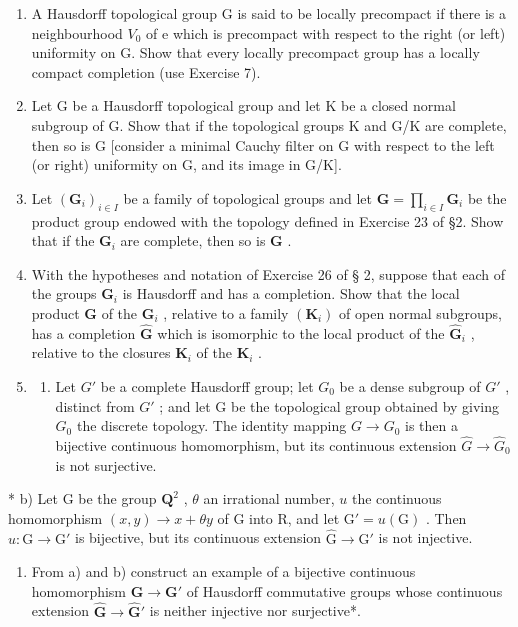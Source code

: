 \begin{enumerate}
\def\labelenumi{\arabic{enumi})}
\setcounter{enumi}{7}
\item
  A Hausdorff topological group G is said to be locally precompact if there is a neighbourhood \(V_{0}\) of e which is precompact with respect to the right (or left) uniformity on G. Show that every locally precompact group has a locally compact completion (use Exercise 7).
\item
  Let G be a Hausdorff topological group and let K be a closed normal subgroup of G. Show that if the topological groups K and G/K are complete, then so is G {[}consider a minimal Cauchy filter on G with respect to the left (or right) uniformity on G, and its image in G/K{]}.
\item
  Let \((\mathbf{G}_i)_{i\in I}\) be a family of topological groups and let \(\mathbf{G} = \prod_{i\in I}\mathbf{G}_i\) be the product group endowed with the topology defined in Exercise 23 of §2. Show that if the \(\mathbf{G}_i\) are complete, then so is \(\mathbf{G}\) .
\item
  With the hypotheses and notation of Exercise 26 of § 2, suppose that each of the groups \(\mathbf{G}_{i}\) is Hausdorff and has a completion. Show that the local product \(\mathbf{G}\) of the \(\mathbf{G}_{i}\) , relative to a family \((\mathbf{K}_{i})\) of open normal subgroups, has a completion \(\hat{\mathbf{G}}\) which is isomorphic to the local product of the \(\hat{\mathbf{G}}_{i}\) , relative to the closures \(\mathbf{K}_{i}\) of the \(\mathbf{K}_{i}\) .
\item
  \begin{enumerate}
  \def\labelenumii{\alph{enumii})}
  \tightlist
  \item
    Let \(G'\) be a complete Hausdorff group; let \(G_{0}\) be a dense subgroup of \(G'\) , distinct from \(G'\) ; and let G be the topological group obtained by giving \(G_{0}\) the discrete topology. The identity mapping \(G \rightarrow G_{0}\) is then a bijective continuous homomorphism, but its continuous extension \(\hat{G} \rightarrow \hat{G}_{0}\) is not surjective.
  \end{enumerate}
\end{enumerate}

* b) Let G be the group \(\mathbf{Q}^2\) , \(\theta\) an irrational number, \(u\) the continuous homomorphism \((x,y)\to x + \theta y\) of G into R, and let \(\mathrm{G}' = u(\mathrm{G})\) . Then \(u: \mathrm{G}\to \mathrm{G}'\) is bijective, but its continuous extension \(\hat{\mathrm{G}}\to \hat{\mathrm{G}}'\) is not injective.

\begin{enumerate}
\def\labelenumi{\alph{enumi})}
\setcounter{enumi}{2}
\tightlist
\item
  From a) and b) construct an example of a bijective continuous homomorphism \(\mathbf{G} \to \mathbf{G}'\) of Hausdorff commutative groups whose continuous extension \(\hat{\mathbf{G}} \to \hat{\mathbf{G}}'\) is neither injective nor surjective*.
\end{enumerate}

